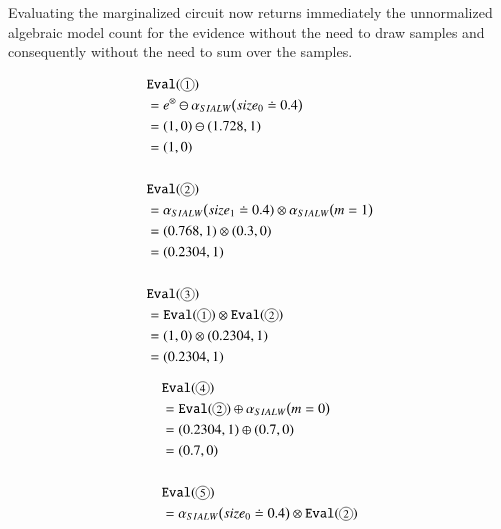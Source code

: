 \begin{example}
\begin{figure}[h]
	\end{figure}
	
Evaluating the marginalized circuit now returns immediately the unnormalized algebraic model count for the evidence without the need to draw samples and consequently without the need to sum over the samples. 

\begin{minipage}{0.49\linewidth}
    \begin{align*}
        &\mathtt{Eval}(\footcircled{$1$})\\
        &=
        e^\otimes \ominus \alpha_{SIALW}\big(size_0\doteq 0.4\big) \\
        &=
        (1,0) \ominus (1.728,1) \\
        &= (1,0)
        \\
        \hfill
        \\
        &\mathtt{Eval}(\footcircled{$2$})\\
        &=
        \alpha_{SIALW}\big( size_1\doteq 0.4) \otimes \alpha_{SIALW}\big(  m=1 \big) \\
        &=
        (0.768,1) \otimes (0.3,0) \\
        &=
        (0.2304,1)\\
        \hfill
        \\
        &\mathtt{Eval}(\footcircled{$3$})\\
        &=
        \mathtt{Eval}(\footcircled{$1$}) \otimes \mathtt{Eval}(\footcircled{$2$}) \\
        &=
        (1,0) \otimes (0.2304,1) \\
        &=
        (0.2304,1)\\
    \end{align*}
\end{minipage}
\vline
\begin{minipage}{0.49\linewidth}
    \begin{align*}
        &\mathtt{Eval}(\footcircled{$4$})\\
        &=
        \mathtt{Eval}(\footcircled{$2$}) \oplus \alpha_{SIALW}\big(  m=0 \big) \\
        &=
        (0.2304,1) \oplus (0.7,0) \\
        &=
        (0.7,0)\\
        \hfill
        \\
        &\mathtt{Eval}(\footcircled{$5$})\\
        &=
        \alpha_{SIALW}\big(  size_0\doteq 0.4 \big) \otimes \mathtt{Eval}(\footcircled{$2$})  \\

\end{align*}
\end{minipage}
\end{example}
